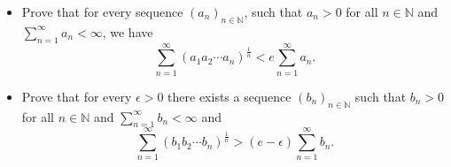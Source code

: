 \begin{itemize}
\item[(a)] Prove that for every sequence \((a_{n})_{n\in \mathbb{N}}\), such that \(a_{n}>0\) for all \(n \in \mathbb{N}\) and
\(\sum_{n=1}^{\infty}a_{n}<\infty\), we have
\[\sum_{n=1}^{\infty}(a_{1}a_{2} \cdots a_{n})^{\frac{1}{n}}< e\sum_{n=1}^{\infty}a_{n}.\]
\item[(b)] Prove that for every \(\epsilon>0\) there exists a sequence \((b_{n})_{n\in \mathbb{N}}\) such that \(b_{n}>0\) for all \(n \in \mathbb{N}\) and
\(\sum_{n=1}^{\infty}b_{n}<\infty\) and
\[\sum_{n=1}^{\infty}(b_{1}b_{2} \cdots b_{n})^{\frac{1}{n}}> (e-\epsilon)\sum_{n=1}^{\infty}b_{n}.\]
\end{itemize}